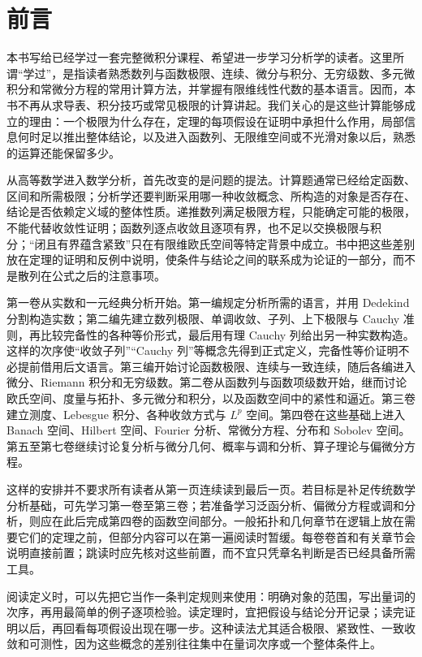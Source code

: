 \chapter*{前言}

本书写给已经学过一套完整微积分课程、希望进一步学习分析学的读者。这里所谓“学过”，是指读者熟悉数列与函数极限、连续、微分与积分、无穷级数、多元微积分和常微分方程的常用计算方法，并掌握有限维线性代数的基本语言。因而，本书不再从求导表、积分技巧或常见极限的计算讲起。我们关心的是这些计算能够成立的理由：一个极限为什么存在，定理的每项假设在证明中承担什么作用，局部信息何时足以推出整体结论，以及进入函数列、无限维空间或不光滑对象以后，熟悉的运算还能保留多少。

从高等数学进入数学分析，首先改变的是问题的提法。计算题通常已经给定函数、区间和所需极限；分析学还要判断采用哪一种收敛概念、所构造的对象是否存在、结论是否依赖定义域的整体性质。递推数列满足极限方程，只能确定可能的极限，不能代替收敛性证明；函数列逐点收敛且逐项有界，也不足以交换极限与积分；“闭且有界蕴含紧致”只在有限维欧氏空间等特定背景中成立。书中把这些差别放在定理的证明和反例中说明，使条件与结论之间的联系成为论证的一部分，而不是散列在公式之后的注意事项。

第一卷从实数和一元经典分析开始。第一编规定分析所需的语言，并用 Dedekind 分割构造实数；第二编先建立数列极限、单调收敛、子列、上下极限与 Cauchy 准则，再比较完备性的各种等价形式，最后用有理 Cauchy 列给出另一种实数构造。这样的次序使“收敛子列”“Cauchy 列”等概念先得到正式定义，完备性等价证明不必提前借用后文语言。第三编开始讨论函数极限、连续与一致连续，随后各编进入微分、Riemann 积分和无穷级数。第二卷从函数列与函数项级数开始，继而讨论欧氏空间、度量与拓扑、多元微分和积分，以及函数空间中的紧性和逼近。第三卷建立测度、Lebesgue 积分、各种收敛方式与 \(L^p\) 空间。第四卷在这些基础上进入 Banach 空间、Hilbert 空间、Fourier 分析、常微分方程、分布和 Sobolev 空间。第五至第七卷继续讨论复分析与微分几何、概率与调和分析、算子理论与偏微分方程。

这样的安排并不要求所有读者从第一页连续读到最后一页。若目标是补足传统数学分析基础，可先学习第一卷至第三卷；若准备学习泛函分析、偏微分方程或调和分析，则应在此后完成第四卷的函数空间部分。一般拓扑和几何章节在逻辑上放在需要它们的定理之前，但部分内容可以在第一遍阅读时暂缓。每卷卷首和有关章节会说明直接前置；跳读时应先核对这些前置，而不宜只凭章名判断是否已经具备所需工具。

阅读定义时，可以先把它当作一条判定规则来使用：明确对象的范围，写出量词的次序，再用最简单的例子逐项检验。读定理时，宜把假设与结论分开记录；读完证明以后，再回看每项假设出现在哪一步。这种读法尤其适合极限、紧致性、一致收敛和可测性，因为这些概念的差别往往集中在量词次序或一个整体条件上。

